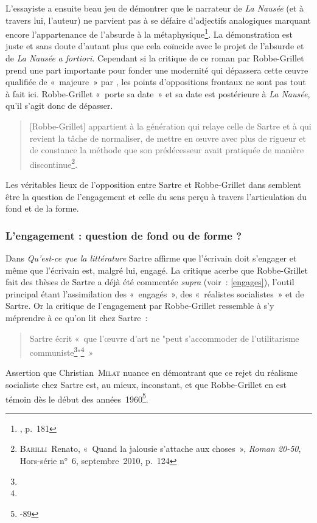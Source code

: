 L'essayiste a ensuite beau jeu de démontrer que le narrateur de \textit{La Nausée} (et à travers lui, l'auteur) ne parvient pas à se défaire d'adjectifs analogiques marquant encore l'appartenance de l'absurde à la métaphysique\footnote{, p.~181}. La démonstration est juste et sans doute d'autant plus que cela coïncide avec le projet de l'absurde et de \textit{La Nausée} \textit{a fortiori}. Cependant si la critique de ce roman par Robbe-Grillet prend une part importante pour fonder une modernité qui dépassera cette œuvre qualifiée de «~majeure~» par \robbe, les points d'oppositions frontaux ne sont pas tout à fait ici. Robbe-Grillet «~porte sa date~» et sa date est postérieure à \textit{La Nausée}, qu'il s'agit donc de dépasser.
\begin{quote}
     [Robbe-Grillet] appartient à la génération qui relaye celle de Sartre et à qui revient la tâche de normaliser, de mettre en œuvre avec plus de rigueur et de constance la méthode que son prédécesseur avait pratiquée de manière discontinue\footnote{\textsc{Barilli}~Renato, «~Quand la jalousie s'attache aux choses~», \textit{Roman 20-50}, Hors-série n°~6, septembre~2010, p.~124}.
\end{quote}


Les véritables lieux de l'opposition entre Sartre et Robbe-Grillet dans \punr{} semblent être la question de l'engagement et celle du sens perçu à travers l'articulation du fond et de la forme.


\subsubsection{L'engagement : question de fond ou de forme ?}


Dans \textit{Qu'est-ce que la littérature} Sartre affirme que l'écrivain doit s'engager et même que l'écrivain est, malgré lui, engagé. La critique acerbe que Robbe-Grillet fait des thèses de Sartre a déjà été commentée \textit{supra} (voir~: \ref{engages}), l'outil principal étant l'assimilation des «~engagés~», des «~réalistes socialistes~» et de Sartre. Or la critique de l'engagement par Robbe-Grillet ressemble à s'y méprendre à ce qu'on lit chez Sartre~:
\begin{quote}
    Sartre écrit «~que l'œuvre d'art ne "peut s'accommoder de l'utilitarisme communiste\footnote{}"\footnote{}~»
\end{quote}
Assertion que Christian~\textsc{Milat} nuance en démontrant que ce rejet du réalisme socialiste chez Sartre est, au mieux, inconstant, et que Robbe-Grillet en est témoin dès le début des années~1960\footnote{-89}.

